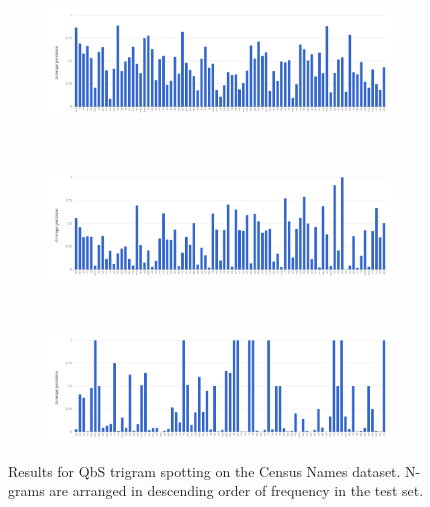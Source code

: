 \documentclass[ms,electronic,twosidetoc,letterpaper,chaptercenter,parttop,lof,lot]{byumsphd}
\begin{document}
\begin{figure}
\centering
\begin{subfigure}{.99\textwidth}
  \centering
  \includegraphics[width=.99\linewidth]{namesTri1Spot}
  \label{fig:namesTri1Spot}
\end{subfigure}
\\
\begin{subfigure}{.99\textwidth}
  \centering
  \includegraphics[width=.99\linewidth]{namesTri2Spot}
  \label{fig:namesTri2Spot}
\end{subfigure}
\\
\begin{subfigure}{.99\textwidth}
  \centering
  \includegraphics[width=.99\linewidth]{namesTri3Spot}
  \label{fig:namesTri3Spot}
\end{subfigure}
\caption{Results for QbS trigram spotting on the Census Names dataset. N-grams are arranged in descending order of frequency in the test set.}
\label{fig:namessub2}
\end{figure}




\end{document}
